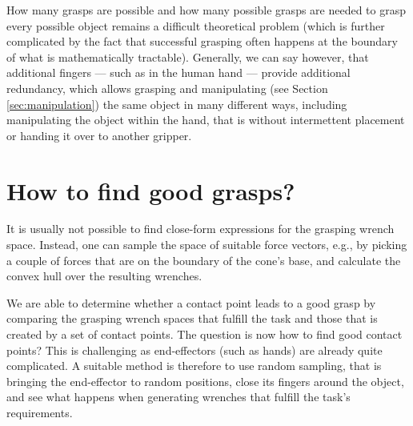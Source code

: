 How many grasps are possible and how many possible grasps are needed to grasp every possible object remains a difficult theoretical problem (which is further complicated by the fact that successful grasping often happens at the boundary of what is mathematically tractable). Generally, we can say however, that additional fingers --- such as in the human hand --- provide additional redundancy, which allows grasping and manipulating (see Section \ref{sec:manipulation}) the same object in many different ways, including manipulating the object within the hand, that is without intermettent placement or handing it over to another gripper. 



\section{How to find good grasps?}

It is usually not possible to find close-form expressions for the grasping wrench space. Instead, one can sample the space of suitable force vectors, e.g., by picking a couple of forces that are on the boundary of the cone's base, and calculate the convex hull over the resulting wrenches.



We are able to determine whether a contact point leads to a good grasp by comparing the grasping wrench spaces that fulfill the task and those that is created by a set of contact points. The question is now how to find good contact points? This is challenging as end-effectors (such as hands) are already quite complicated. A suitable method is therefore to use random sampling, that is bringing the end-effector to random positions, close its fingers around the object, and see what happens when generating wrenches that fulfill the task's requirements.

